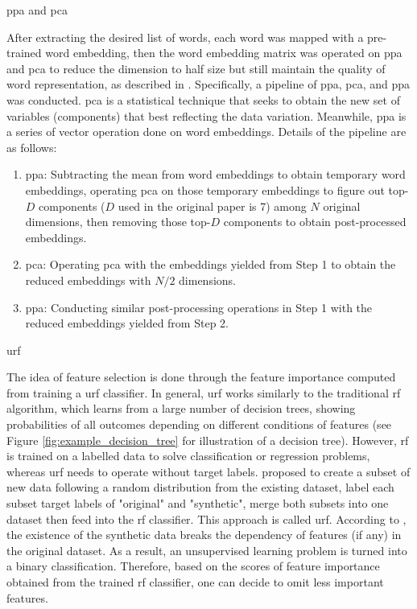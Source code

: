 \documentclass[a4paper,man,floatsintext,natbib,noextraspace]{apa6}
\makeatletter
\renewcommand{\subsubsection}{\@startsection{subsubsection}{3}
  {\z@}
  {\b@level@two@skip}
  {\e@level@two@skip}
  {\normalfont\normalsize\bfseries\itshape}}
\makeatother
\begin{document}
\subsubsection{\gls{ppa} and \gls{pca}}

After extracting the desired list of words, each word was mapped with a pre-trained word embedding, then the word embedding matrix was operated on \gls{ppa} and \gls{pca} to reduce the dimension to half size but still maintain the quality of word representation, as described in \cite{raunakEffectiveDimensionalityReduction2019}. Specifically, a pipeline of \gls{ppa}, \gls{pca}, and \gls{ppa} was conducted. \gls{pca} is a statistical technique that seeks to obtain the new set of variables (components) that best reflecting the data variation. Meanwhile, \gls{ppa} is a series of vector operation done on word embeddings. Details of the pipeline are as follows:

\begin{enumerate}
    \item \gls{ppa}: Subtracting the mean from word embeddings to obtain temporary word embeddings, operating \gls{pca} on those temporary embeddings to figure out top-$D$ components ($D$ used in the original paper is 7) among $N$ original dimensions, then removing those top-$D$ components to obtain post-processed embeddings.
    \item \gls{pca}: Operating \gls{pca} with the embeddings yielded from Step 1 to obtain the reduced embeddings with $N/2$ dimensions.
    \item \gls{ppa}: Conducting similar post-processing operations in Step 1 with the reduced embeddings yielded from Step 2. 
\end{enumerate}

\subsubsection{\gls{urf}}

The idea of feature selection is done through the feature importance computed from training a \gls{urf} classifier. In general, \gls{urf} works similarly to the traditional \gls{rf} algorithm, which learns from a large number of decision trees, showing probabilities of all outcomes depending on different conditions of features (see Figure \ref{fig:example_decision_tree} for illustration of a decision tree). However, \gls{rf} is trained on a labelled data to solve classification or regression problems, whereas \gls{urf} needs to operate without target labels. \cite{breimanManualSettingUsing2002} proposed to create a subset of new data following a random distribution from the existing dataset, label each subset target labels of "original" and "synthetic", merge both subsets into one dataset then feed into the \gls{rf} classifier. This approach is called \gls{urf}. According to \cite{breimanManualSettingUsing2002}, the existence of the synthetic data breaks the dependency of features (if any) in the original dataset. As a result, an unsupervised learning problem is turned into a binary classification. Therefore, based on the scores of feature importance obtained from the trained \gls{rf} classifier, one can decide to omit less important features. 
\end{document}
